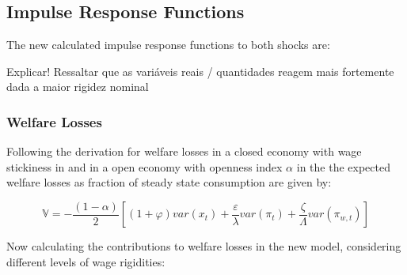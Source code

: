 \documentclass{article}
\begin{document}
\subsection{Impulse Response Functions}
The new calculated impulse response functions to both shocks are:

\begin{figure}[H]
\centering

\end{figure}

\begin{figure}[H]
\centering

\end{figure}

Explicar! Ressaltar que as variáveis reais / quantidades reagem mais fortemente dada a maior rigidez nominal\\

\begin{figure}[H]
\centering

\end{figure}

\subsubsection{Welfare Losses}
Following the derivation for welfare losses in a closed economy with wage stickiness in \citet[Appendix.~6.1]{gali2015} and in a open economy with openness index $\alpha$ in \cite{rhee} the the expected welfare losses as fraction of steady state consumption are given by:

\begin{equation}
    \mathbb V = -\frac{(1-\alpha)}{2} \left[ (1 + \varphi) var(x_t) + \frac{\varepsilon}{\lambda} var(\pi_t) + \frac{\zeta}{\Lambda} var(\pi_{w,t}) \right] 
\end{equation}

Now calculating the contributions to welfare losses in the new model, considering different levels of wage rigidities:
\end{document}
